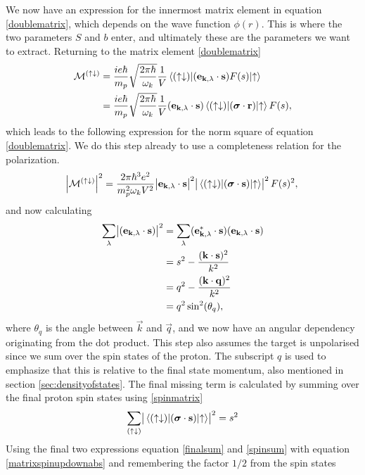 We now have an expression for the innermost matrix element in equation \eqref{doublematrix}, which depends on the wave function $\phi(r)$. This is where the two parameters $S$ and $b$ enter, and ultimately these are the parameters we want to extract. Returning to the matrix element \eqref{doublematrix}
\begin{align}
	\mathcal{M^{(\uparrow\downarrow)}} &= \frac{ie\hbar}{m_p}\sqrt{\frac{2\pi \hbar}{\omega_k}}\frac{1}{V}\mel*{(\uparrow\downarrow)}{(\bm{\mathrm{e}}_{\bm{\mathrm{k}},\lambda}\cdot\bm{\mathrm{s}})F(s)}{\uparrow} \\
	&=\frac{ie\hbar}{m_p}\sqrt{\frac{2\pi \hbar}{\omega_k}}\frac{1}{V} (\bm{\mathrm{e}}_{\bm{\mathrm{k}},\lambda}\cdot\bm{\mathrm{s}})\mel*{(\uparrow\downarrow)}{(\bm{\mathrm{\sigma}}\cdot \bm{\mathrm{r}})}{\uparrow}F(s),
\end{align}
which leads to the following expression for the norm square of equation \eqref{doublematrix}. We do this step already to use a completeness relation for the polarization.
\begin{equation} \label{matrixspinupdownabs}
	\abs{\mathcal{M}^{(\uparrow\downarrow)}}^2 = \frac{2\pi\hbar^3e^2}{m_p^2\omega_k V^2} \abs{\bm{\mathrm{e}}_{\bm{\mathrm{k}},\lambda}\cdot \bm{\mathrm{s}}}^2 \abs{\mel*{(\uparrow\downarrow)}{(\bm{\mathrm{\sigma}}\cdot \bm{\mathrm{s}})}{\uparrow}}^2 F(s)^2,
\end{equation}
and now calculating
\begin{align} \label{sumoverpol}
	\sum_\lambda \abs{(\bm{\mathrm{e}}_{\bm{\mathrm{k}},\lambda} \cdot \bm{\mathrm{s}})}^2 &= \sum_\lambda (\bm{\mathrm{e}}_{\bm{\mathrm{k}},\lambda}^*\cdot \bm{\mathrm{s}})(\bm{\mathrm{e}}_{\bm{\mathrm{k}},\lambda}\cdot\bm{\mathrm{s}}) \\
	&= s^2 -\frac{(\bm{\mathrm{k}}\cdot \bm{\mathrm{s}})^2}{k^2} \\
	&= q^2 -\frac{(\bm{\mathrm{k}}\cdot \bm{\mathrm{q}})^2}{k^2} \\
	&= q^2 \sin^2(\theta_q),\label{finalsum}
\end{align}
where $\theta_q$ is the angle between $\vec{k}$ and $\vec{q}$, and we now have an angular dependency originating from the dot product. This step also assumes the target is unpolarised since we sum over the spin states of the proton. The subscript $q$ is used to emphasize that this is relative to the final state momentum, also mentioned in section \ref{sec:densityofstates}. The final missing term is calculated by summing over the final proton spin states using \eqref{spinmatrix}
\begin{equation} \label{spinsum}
	\sum_{(\uparrow\downarrow)} \abs{\mel*{(\uparrow\downarrow)}{(\bm{\mathrm{\sigma}}\cdot\bm{\mathrm{s}})}{\uparrow}}^2 = s^2
\end{equation}
Using the final two expressions equation \eqref{finalsum} and \eqref{spinsum} with equation \eqref{matrixspinupdownabs} and remembering the factor $1/2$ from the spin states
